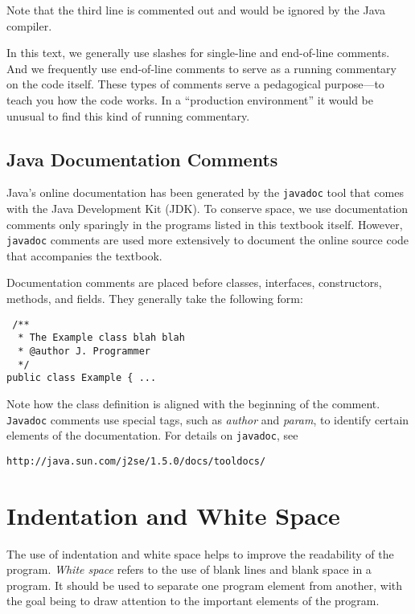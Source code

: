 \noindent Note that the third line is commented out and
would be ignored by the Java compiler.

In this text, we generally use slashes for single-line and end-of-line
comments.  And we frequently use end-of-line comments to serve as a
running commentary on the code itself.  These types of comments serve a
pedagogical purpose---to teach you how the code works.  In a
``production environment'' it would be unusual to find this kind of
running commentary.

\subsection*{Java Documentation Comments}
\noindent Java's online documentation has been generated by the {\tt javadoc}
tool that comes with the Java Development Kit (JDK). To conserve
space, we use documentation comments only sparingly in the programs
listed in this textbook itself.  However, {\tt javadoc} comments are
used more extensively to document the online source code that accompanies
the textbook.

Documentation comments are placed before classes, interfaces,
constructors, methods, and fields.  They generally take the
following form:

\begin{jjjlisting}
\begin{lstlisting}
 /**
  * The Example class blah blah
  * @author J. Programmer
  */
public class Example { ...
\end{lstlisting}
\end{jjjlisting}

\noindent Note how the class definition is aligned with the beginning of the
comment.  {\tt Javadoc} comments use special tags, such as {\it author} and
{\it param}, to identify certain elements of the documentation.  For details
on {\tt javadoc}, see

\begin{jjjlisting}
\begin{lstlisting}[commentstyle=\color{black}]
http://java.sun.com/j2se/1.5.0/docs/tooldocs/
\end{lstlisting}
\end{jjjlisting}

\section*{Indentation and White Space}
\label{indentationand-white-space}
\noindent The use of indentation and white space helps to improve the
readability of the program.   {\it White space} refers to the use of
blank lines and blank space in a program.  It should be used to
separate one program element from another, with the goal being to draw
attention to the important elements of the program.

